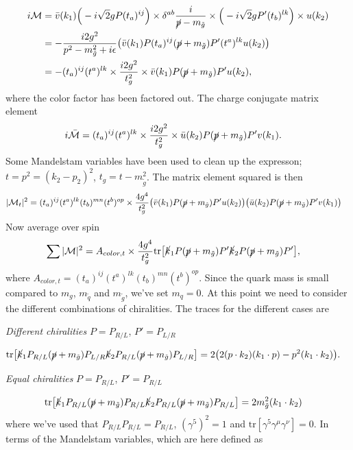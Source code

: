 \documentclass[11pt]{article}
\begin{document}
\begin{flushleft}
\begin{align*}
i \mathcal{M} &= \bar{v} (k_1) \Big( -i \sqrt{2} g P (t_a)^{ij}\Big) \times \delta^{ab} \frac{i}{\cancel{p} - m_{\tilde{g}}} \times \Big( -i \sqrt{2} gP'(t_b)^{lk} \Big) \times u(k_2)\\
&= - \frac{i 2 g^2}{p^2 - m_{\tilde{g}}^2 + i \epsilon}\big( \bar{v} (k_1)  P (t_a)^{ij}(\cancel{p} + m_{\tilde{g}}) P'(t^a)^{lk} u(k_2) \big)\\
&= - (t_a)^{ij}(t^a)^{lk} \times \frac{i 2 g^2}{t_g^2} \times  \bar{v} (k_1)  P (\cancel{p} + m_{\tilde{g}}) P' u(k_2) ,
\end{align*}
where the color factor has been factored out. The charge conjugate matrix element
\begin{align*}
i \mathcal{\bar{M}} & = (t_a)^{ij}(t^a)^{lk} \times \frac{i 2 g^2}{t_g^2} \times \bar{u} (k_2)  P (\cancel{p} + m_{\tilde{g}}) P' v(k_1) .
\end{align*}
Some Mandelstam variables have been used to clean up the expresson; $t= p^2 = (k_2 - p_2)^2$, $t_g = t - m_{\tilde{g}}^2$. The matrix element squared is then
\begin{align*}
|\mathcal{M}_t|^2 &=  (t_a)^{ij} (t^a)^{lk} (t_b)^{mn} (t^b)^{op} \times \frac{4 g^4}{t_g^2}
\big( \bar{v} (k_1)  P (\cancel{p} + m_{\tilde{g}}) P' u(k_2) \big)
\big( \bar{u} (k_2)  P (\cancel{p} + m_{\tilde{g}}) P' v(k_1) \big)
\end{align*}
Now average over spin
\begin{align*}
\sum |\mathcal{M}|^2 &= A_{color, t} \times \frac{4 g^4}{t_g^2} \text{tr} \big[ 
\cancel{k}_1 P (\cancel{p} + m_{\tilde{g}}) P' \cancel{k}_2 P (\cancel{p} + m_{\tilde{g}}) P' \big],
\end{align*}
where $A_{color, t}= (t_a)^{ij} (t^a)^{lk} (t_b)^{mn} (t^b)^{op}$. Since the quark mass is small compared to $m_g$, $m_{\tilde{q}}$ and $m_{\tilde{g}}$, we've set $m_q=0$.
At this point we need to consider the different combinations of chiralities. The traces for the different cases are
\begin{center}
\textit{Different chiralities }$P=P_{R/L}$, $P'=P_{L/R}$
\end{center}
\begin{align*}
\text{tr} \big[ 
\cancel{k}_1 P_{R/L} (\cancel{p} + m_{\tilde{g}}) P_{L/R} \cancel{k}_2 P_{R/L} (\cancel{p} + m_{\tilde{g}}) P_{L/R} \big]
&= 2 \big(
2 (p \cdot k_2) (k_1 \cdot p) - p^2 (k_1 \cdot k_2)\big).
\end{align*}

\begin{center}
\textit{Equal chiralities} $P=P_{R/L}$, $P'=P_{R/L}$
\end{center}
\begin{align*}
\text{tr} \big[ 
\cancel{k}_1 P_{R/L} (\cancel{p} + m_{\tilde{g}}) P_{R/L} \cancel{k}_2 P_{R/L} (\cancel{p} + m_{\tilde{g}}) P_{R/L} \big]&= 2  m_{\tilde{g}}^2 (k_1 \cdot k_2)
\end{align*}
where we've used that $P_{R/L}P_{R/L} = P_{R/L}$, $(\gamma^5)^2 = 1$ and $\text{tr}[\gamma^5 \gamma^{\mu} \gamma^{\nu}]=0$. In terms of the Mandelstam variables, which are here defined as
\begin{multicols}{3}


\end{multicols}
\end{flushleft}
\end{document}

